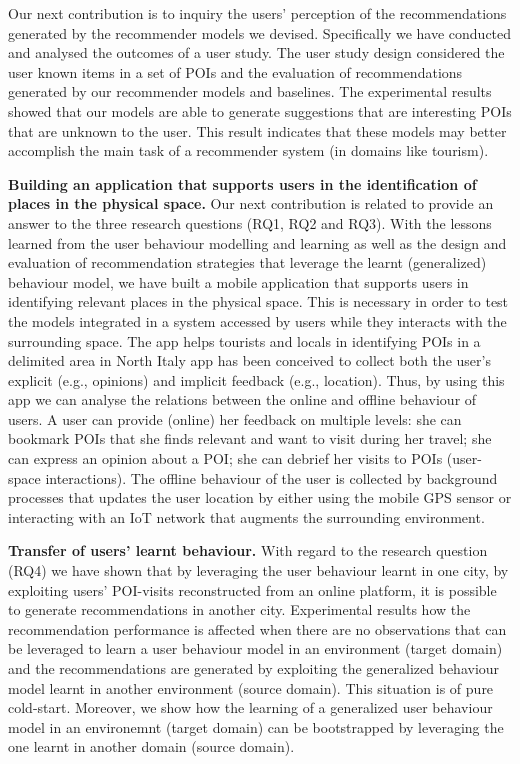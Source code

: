 Our next contribution is to inquiry the users' perception of the recommendations generated by the recommender models we devised. Specifically we have conducted and analysed the outcomes of a user study. The user study design considered the user known items in a set of POIs and the evaluation of recommendations generated by our recommender models and baselines. The experimental results showed that our models are able to generate suggestions that are interesting POIs that are unknown to the user. This result indicates that these models may better accomplish the main task of a recommender system (in domains like tourism). \newline

\noindent \textbf{Building an application that supports users in the identification of places in the physical space.} Our next contribution is related to provide an answer to the three research questions (RQ1, RQ2 and RQ3). With the lessons learned from the user behaviour modelling and learning as well as the design and evaluation of recommendation strategies that leverage the learnt (generalized) behaviour model, we have built a mobile application that supports users in identifying relevant places in the physical space. This is necessary in order to test the models integrated in a system accessed by users while they interacts with the surrounding space.
The app helps tourists and locals in identifying POIs in a delimited area in North Italy app has been conceived to collect both the user's explicit (e.g., opinions) and implicit feedback (e.g., location). Thus, by using this app we can analyse the relations between the online and offline behaviour of users. A user can provide (online) her feedback on multiple levels: she can bookmark POIs that she finds relevant and want to visit during her travel; she can express an opinion about a POI; she can debrief her visits to POIs (user-space interactions). The offline behaviour of the user is collected by background processes that updates the user location by either using the mobile GPS sensor or interacting with an IoT network that augments the surrounding environment.  \newline

\noindent \textbf{Transfer of users' learnt behaviour.} With regard to the research question (RQ4) we have shown that by leveraging the user behaviour learnt in one city, by exploiting users' POI-visits reconstructed from an online platform, it is possible to generate recommendations in another city. Experimental results how the recommendation performance is affected when there are no observations that can be leveraged to learn a user behaviour model in an environment (target domain) and the recommendations are generated by exploiting the generalized behaviour model learnt in another environment (source domain). This situation is of pure cold-start. Moreover, we show how the learning of a generalized user behaviour model in an environemnt (target domain) can be bootstrapped by leveraging the one learnt in another domain (source domain). \newline

